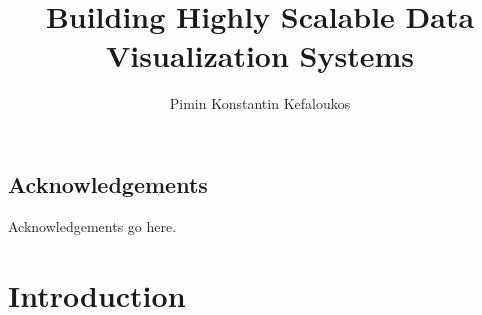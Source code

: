 \documentclass[11pt, oneside]{report}
\title{Building Highly Scalable Data Visualization Systems}
\author{Pimin Konstantin Kefaloukos}
\begin{document}
\maketitle

\section*{Acknowledgements}
Acknowledgements go here.

\tableofcontents



\chapter{Introduction}
\label{chapter:introduction}




\end{document}
